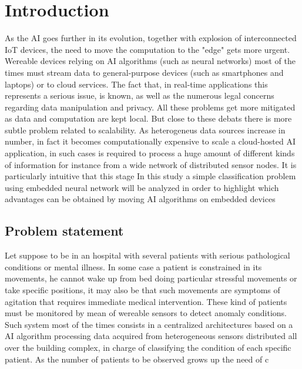 \section{Introduction}
As the AI goes further in its evolution, together with explosion of interconnected IoT devices, the need to move the computation to the "edge" gets more urgent. Wereable devices relying on AI algorithms (such as neural networks) most of the times must stream data to general-purpose devices (such as smartphones and laptops) or to cloud services. The fact that, in real-time applications this represents a serious issue, is known, as well as the numerous legal concerns regarding data manipulation and privacy. All these problems get more mitigated as data and computation are kept local. But close to these debats there is more subtle problem related to scalability. As heterogeneus data sources increase in number, in fact it becomes computationally expensive to scale a cloud-hosted AI application, in such cases is required to process a huge amount of different kinds of information for instance from a wide network of distributed sensor nodes. It is particularly intuitive that this stage In this study a simple classification problem using embedded neural network will be analyzed in order to highlight which advantages can be obtained by moving AI algorithms on embedded devices 

\subsection{Problem statement}
Let suppose to be in an hospital with several patients with serious pathological conditions or mental illness. In some case a patient is constrained in its movements, he cannot wake up from bed doing particular stressful movements or take specific positions, it may also be  that such movements are symptoms of agitation that requires immediate medical intervention. These kind of patients must be monitored by mean of wereable sensors to detect anomaly conditions. Such system most of the times consists in a centralized architectures based on a AI algorithm processing data acquired from heterogeneous sensors distributed all over the building complex, in charge of classifying the condition of each specific patient. As the number of patients to be observed grows up the need of c

